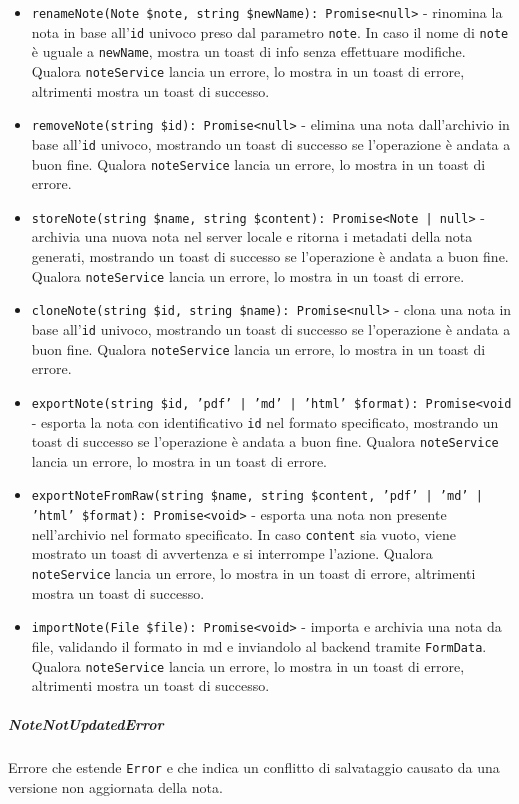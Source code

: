 \documentclass[a4paper,10pt]{article}
\begin{document}
\begin{itemize}
\begin{itemize}
        \item Altrimenti aggiorna il nome e il contenuto della nota
    \end{itemize}
    Qualora \texttt{noteService} lancia un errore, lo mostra in un toast di errore, altrimenti mostra un toast di successo.
    \item \texttt{renameNote(Note \$note, string \$newName): Promise<null>} - rinomina la nota in base all'\texttt{id} univoco preso dal parametro \texttt{note}. In caso il nome di \texttt{note} è uguale a \texttt{newName}, mostra un toast di info senza effettuare modifiche. Qualora \texttt{noteService} lancia un errore, lo mostra in un toast di errore, altrimenti mostra un toast di successo.
    \item \texttt{removeNote(string \$id): Promise<null>} - elimina una nota dall'archivio in base all'\texttt{id} univoco, mostrando un toast di successo se l'operazione è andata a buon fine. Qualora \texttt{noteService} lancia un errore, lo mostra in un toast di errore.
    \item \texttt{storeNote(string \$name, string \$content): Promise<Note | null>} - archivia una nuova nota nel server locale e ritorna i metadati della nota generati, mostrando un toast di successo se l'operazione è andata a buon fine. Qualora \texttt{noteService} lancia un errore, lo mostra in un toast di errore.
    \item \texttt{cloneNote(string \$id, string \$name): Promise<null>} - clona una nota in base all'\texttt{id} univoco, mostrando un toast di successo se l'operazione è andata a buon fine. Qualora \texttt{noteService} lancia un errore, lo mostra in un toast di errore.
    \item \texttt{exportNote(string \$id, 'pdf' | 'md' | 'html' \$format): Promise<void} - esporta la nota con identificativo \texttt{id} nel formato specificato, mostrando un toast di successo se l'operazione è andata a buon fine. Qualora \texttt{noteService} lancia un errore, lo mostra in un toast di errore.
    \item \texttt{exportNoteFromRaw(string \$name, string \$content, 'pdf' | 'md' | 'html' \$format): Promise<void>} - esporta una nota non presente nell'archivio nel formato specificato. In caso \texttt{content} sia vuoto, viene mostrato un toast di avvertenza e si interrompe l'azione. Qualora \texttt{noteService} lancia un errore, lo mostra in un toast di errore, altrimenti mostra un toast di successo.
    \item \texttt{importNote(File \$file): Promise<void>} - importa e archivia una nota da file, validando il formato in md e inviandolo al backend tramite \texttt{FormData}. Qualora \texttt{noteService} lancia un errore, lo mostra in un toast di errore, altrimenti mostra un toast di successo.
\end{itemize}
\subparagraph{NoteNotUpdatedError} Errore che estende \texttt{Error} e che indica un conflitto di salvataggio causato da una versione non aggiornata della nota.
\end{document}
